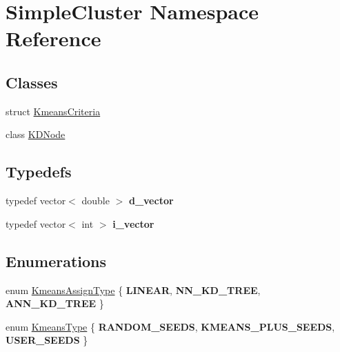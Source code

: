 \hypertarget{namespaceSimpleCluster}{\section{Simple\-Cluster Namespace Reference}
\label{namespaceSimpleCluster}
}
\subsection*{Classes}
\begin{DoxyCompactItemize}
\item 
struct \hyperlink{structSimpleCluster_1_1KmeansCriteria}{Kmeans\-Criteria}
\item 
class \hyperlink{classSimpleCluster_1_1KDNode}{K\-D\-Node}
\end{DoxyCompactItemize}
\subsection*{Typedefs}
\begin{DoxyCompactItemize}
\item 
\hypertarget{namespaceSimpleCluster_a2c39f662ef8ab290b2a0613dbc3b4c4e}{typedef vector$<$ double $>$ {\bfseries d\-\_\-vector}}\label{namespaceSimpleCluster_a2c39f662ef8ab290b2a0613dbc3b4c4e}

\item 
\hypertarget{namespaceSimpleCluster_ab17abba17860f283d1defd90861cb798}{typedef vector$<$ int $>$ {\bfseries i\-\_\-vector}}\label{namespaceSimpleCluster_ab17abba17860f283d1defd90861cb798}

\end{DoxyCompactItemize}
\subsection*{Enumerations}
\begin{DoxyCompactItemize}
\item 
enum \hyperlink{namespaceSimpleCluster_a1ad2d6129171ff9a5ee57f48b5f3f6e1}{Kmeans\-Assign\-Type} \{ {\bfseries L\-I\-N\-E\-A\-R}, 
{\bfseries N\-N\-\_\-\-K\-D\-\_\-\-T\-R\-E\-E}, 
{\bfseries A\-N\-N\-\_\-\-K\-D\-\_\-\-T\-R\-E\-E}
 \}
\item 
enum \hyperlink{namespaceSimpleCluster_a8a8f57121b69a7b43575e4d6a53928e2}{Kmeans\-Type} \{ {\bfseries R\-A\-N\-D\-O\-M\-\_\-\-S\-E\-E\-D\-S}, 
{\bfseries K\-M\-E\-A\-N\-S\-\_\-\-P\-L\-U\-S\-\_\-\-S\-E\-E\-D\-S}, 
{\bfseries U\-S\-E\-R\-\_\-\-S\-E\-E\-D\-S}
 \}
\end{DoxyCompactItemize}
